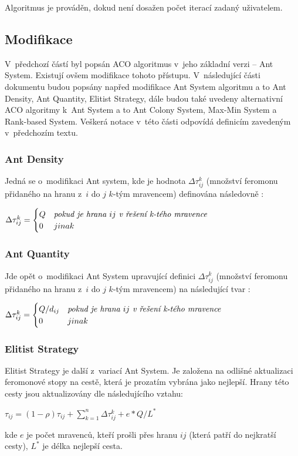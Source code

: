 \documentclass[a4paper, 12pt]{article}
\begin{document}
Algoritmus je prováděn, dokud není dosažen počet iterací zadaný uživatelem.

\subsection{Modifikace}
\label{subsec:modif}
V~předchozí částí byl popsán ACO algoritmus v~jeho základní verzi -- Ant System. Existují ovšem modifikace tohoto přístupu.
V~následující části dokumentu budou popsány napřed modifikace Ant System algoritmu a to Ant Density, Ant Quantity, Elitist Strategy, dále budou
také uvedeny alternativní ACO algoritmy k~Ant System a to Ant Colony System, Max-Min System a Rank-based System. Veškerá notace v~této části odpovídá
definicím zavedeným v~předchozím textu.

\subsubsection{Ant Density}
Jedná se o~modifikaci Ant system, kde je hodnota $\Delta\tau_{ij}^k$ (množství feromonu přidaného na hranu z~$i$ do $j$ $k$-tým mravencem) definována
následovně \cite{aco:variations}:
\begin{center}
  $\Delta\tau_{ij}^k = 
  \begin{cases}
    Q & \emph{pokud je hrana } ij \emph{ v~řešení k-tého mravence}\\
    0 & jinak
   \end{cases}
   $
\end{center}

\subsubsection{Ant Quantity}
Jde opět o~modifikaci Ant System upravující definici $\Delta\tau_{ij}^k$ (množství feromonu přidaného na hranu z~$i$ do $j$ $k$-tým mravencem) na následující
tvar \cite{aco:variations}:
\begin{center}
  $\Delta\tau_{ij}^k = 
  \begin{cases}
    Q/d_{ij} & \emph{pokud je hrana } ij \emph{ v~řešení k-tého mravence}\\
    0 & jinak
   \end{cases}
   $
\end{center}

\subsubsection{Elitist Strategy}
Elitist Strategy je další z~variací Ant System. Je založena na odlišné aktualizaci feromonové stopy na cestě, která je prozatím vybrána jako nejlepší.
Hrany této cesty jsou aktualizovány dle následujícího vztahu\cite{aco:variations}:
\begin{center}
  $\tau_{ij}=(1-\rho)\tau_{ij}+\sum\limits_{k=1}^{n}\Delta\tau_{ij}^k + e*Q/L^*$
\end{center}
kde $e$ je počet mravenců, kteří prošli přes hranu $ij$ (která patří do nejkratší cesty), $L^{*}$ je délka nejlepší cesta.
\end{document}
